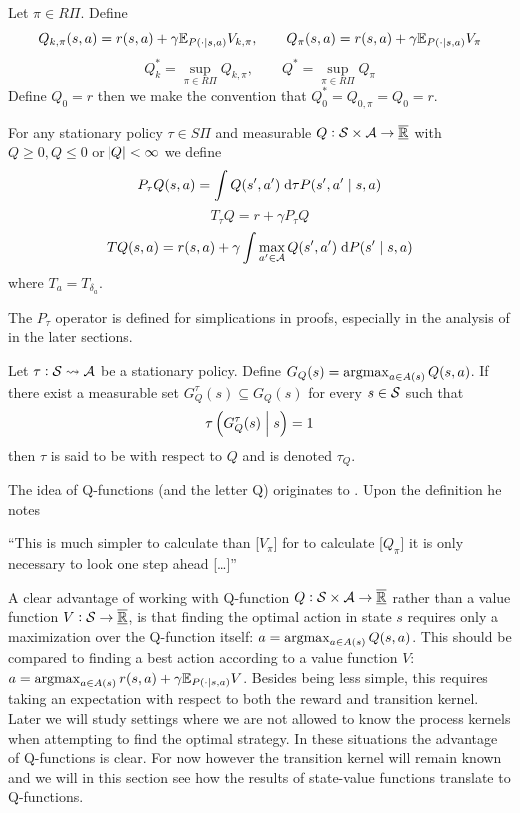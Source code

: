 \begin{defn}
  Let $\pi \in R\Pi$.
  Define
  \[ Q_{k, \pi}(s, a) = r(s, a) + \gamma \mathbb{E}_{P(\cdot \mid s, a)} V_{k, \pi}
  ,\qquad Q_\pi(s, a) = r(s, a) + \gamma \mathbb{E}_{P(\cdot \mid s, a)} V_\pi \]
  \[ Q^*_k = \sup_{\pi \in R\Pi} Q_{k, \pi}
  , \qquad Q^* = \sup_{\pi \in R\Pi} Q_\pi \]
  Define $Q_0 = r$ then we make the convention that
  $Q^*_0 = Q_{0,\pi} = Q_0 = r$.
  \label{defn:polEvalQ}
\end{defn}
\begin{defn}
  For any stationary policy $\tau \in S\Pi$
  and measurable $Q:\mathcal{S} \times \mathcal{A} \to \overline{\underline{\mathbb{R}}}$ with
  $Q \geq 0, Q \leq 0$ or $\abs{Q} < \infty$ we define
  \[ P_\tau Q(s, a) = \int Q(s', a') \; \mathrm{d} \tau P(s', a' \mid s, a) \]
  \[ T_\tau Q = r + \gamma P_\tau Q \]
  \[ T Q(s, a) = r(s, a) + \gamma
  \int \max_{a' \in \mathcal{A}} Q(s', a') \; \mathrm{d} P(s' \mid s, a) \]
  where $T_a = T_{\delta_a}$.
  \label{defn:opQ}
\end{defn}
\begin{rem}
  The $P_\tau$ operator is defined for simplications in proofs, especially
  in the analysis of  in the later sections.
\end{rem}
\begin{defn}
  Let $\tau : \mathcal{S} \leadsto \mathcal{A}$ be a stationary policy. Define
  $G_Q(s) = \operatorname*{argmax}_{a \in A(s)} Q(s, a)$.
  If there exist a measurable set $G_Q^\tau(s) \subseteq G_Q(s)$
  for every $s \in \mathcal{S}$ such that
  \[ \tau \left( G_Q^\tau(s) \;\middle\vert\; s \right) = 1 \]
  then $\tau$ is said to be  with respect to $Q$ and is
  denoted $\tau_Q$.
  \label{defn:greedyQ}
\end{defn}

The idea of Q-functions (and the letter Q) originates to
. Upon the definition he notes
\begin{displayquote}
  ``This is much simpler to calculate than [$V_\pi$]
  for to calculate [$Q_\pi$] it is only necessary to look one
  step ahead [\ldots]''
\end{displayquote}
A clear advantage of working with Q-function
$Q:\mathcal{S}\times\mathcal{A} \to \overline{\underline{\mathbb{R}}}$ rather than a value function
$V:\mathcal{S}\to \overline{\underline{\mathbb{R}}}$,
is that finding the optimal action in state $s$
requires only a maximization over the Q-function itself:
$a = \operatorname*{argmax}_{a \in A(s)} Q(s,a)$.
This should be compared to finding a best action according to a value
function $V$:
$a = \operatorname*{argmax}_{a \in A(s)} r(s,a) + \gamma \mathbb{E}_{P(\cdot \mid s,a)} V$.
Besides being less simple,
this requires taking an expectation with respect to 
both the reward and transition kernel.
Later we will study settings where we are not allowed to know
the process kernels when attempting to find the optimal strategy.
In these situations the advantage of Q-functions is clear.
For now however the transition kernel will remain known and we
will in this section see how the results of state-value functions
translate to Q-functions.

